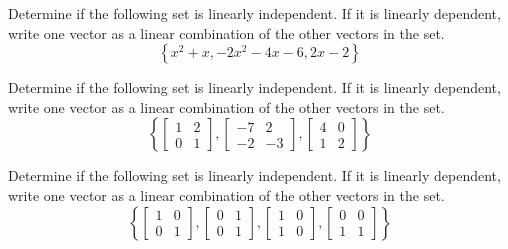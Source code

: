 \documentclass{ximera}
\begin{document}
\begin{problem}\label{prb:10.53} Determine if the following set is linearly independent. If it is linearly dependent, write one vector as a linear combination of the other vectors in the set.
\[
\left\{ x^2 + x, -2x^2 -4x -6 , 2x - 2 \right\}
\]
\end{problem}

\begin{problem}\label{prb:10.54} Determine if the following set is linearly independent. If it is linearly dependent, write one vector as a linear combination of the other vectors in the set.
\[
\left\{ \left[ \begin{array}{rr}
1 & 2 \\
0 & 1
\end{array} \right], \left[ \begin{array}{rr}
-7 & 2 \\
-2 & -3
\end{array} \right], \left[ \begin{array}{rr}
4 & 0 \\
1 & 2
\end{array} \right]
 \right\}
\]
\end{problem}

\begin{problem}\label{prb:10.55} Determine if the following set is linearly independent. If it is linearly dependent, write one vector as a linear combination of the other vectors in the set.
\[
\left\{ \left[ \begin{array}{rr}
1 & 0 \\
0 & 1
\end{array} \right], \left[ \begin{array}{rr}
0 & 1 \\
0 & 1
\end{array} \right], \left[ \begin{array}{rr}
1 & 0 \\
1 & 0
\end{array} \right], \left[ \begin{array}{rr}
0 & 0 \\
1 & 1
\end{array} \right]
 \right\}
\]
\end{problem}
\end{document}
